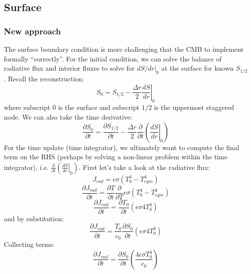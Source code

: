 \subsection{Surface}
\subsubsection{New approach}
The surface boundary condition is more challenging that the CMB to implement formally ``correctly''.  For the initial condition, we can solve the balance of radiative flux and interior fluxes to solve for $dS/dr|_0$ at the surface for known $S_{1/2}$.  Recall the reconstruction:
\begin{equation}
S_0 = S_{1/2} - \frac{\Delta r}{2} \left.\frac{dS}{dr}\right|_0
\end{equation}
where subscript 0 is the surface and subscript $1/2$ is the uppermost staggered node.  We can also take the time derivative:
\begin{equation}
\frac{\partial S_0}{\partial t} = \frac{\partial S_{1/2}}{\partial t} - \frac{\Delta r}{2} \frac{\partial}{\partial t} \left( \left. \frac{dS}{dr}\right|_0 \right)
\end{equation}
For the time update (time integrator), we ultimately want to compute the final term on the RHS (perhaps by solving a non-linear problem within the time integrator), i.e. $\frac{\partial}{\partial t} \left( \left. \frac{dS}{dr}\right|_0 \right)$.  First let's take a look at the radiative flux:
\begin{equation}
J_{rad} = \epsilon \sigma (T_0^4 - T_{eqm}^4)
\end{equation}
\begin{equation}
\frac{\partial J_{rad}}{\partial t} = \frac{\partial T}{\partial t} \frac{\partial}{\partial T} \epsilon \sigma (T_0^4 - T_{eqm}^4)
\end{equation}
\begin{equation}
\frac{\partial J_{rad}}{\partial t} = \frac{\partial T_0}{\partial t} (\epsilon \sigma 4 T_0^3)
\end{equation}
and by substitution:
\begin{equation}
\frac{\partial J_{rad}}{\partial t} = \frac{T_0}{c_0} \frac{\partial S_0}{\partial t} (\epsilon \sigma 4 T_0^3)
\end{equation}
Collecting terms:
\begin{equation}
\frac{\partial J_{rad}}{\partial t} = \frac{\partial S_0}{\partial t} \left( \frac{4 \epsilon \sigma T_0^4}{c_0} \right)
\end{equation}
